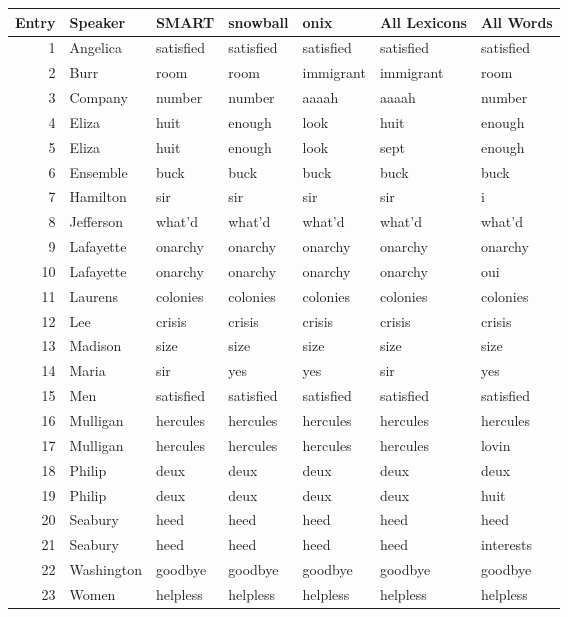 
\begin{tabular}{r|l|l|l|l|l|l}
\hline
\textbf{Entry} & \textbf{Speaker} & \textbf{SMART} & \textbf{snowball} & \textbf{onix} & \textbf{All Lexicons} & \textbf{All Words}\\
\hline
1 & Angelica & satisfied & satisfied & satisfied & satisfied & satisfied\\
\hline
2 & Burr & room & room & immigrant & immigrant & room\\
\hline
3 & Company & number & number & aaaah & aaaah & number\\
\hline
4 & Eliza & huit & enough & look & huit & enough\\
\hline
5 & Eliza & huit & enough & look & sept & enough\\
\hline
6 & Ensemble & buck & buck & buck & buck & buck\\
\hline
7 & Hamilton & sir & sir & sir & sir & i\\
\hline
8 & Jefferson & what'd & what'd & what'd & what'd & what'd\\
\hline
9 & Lafayette & onarchy & onarchy & onarchy & onarchy & onarchy\\
\hline
10 & Lafayette & onarchy & onarchy & onarchy & onarchy & oui\\
\hline
11 & Laurens & colonies & colonies & colonies & colonies & colonies\\
\hline
12 & Lee & crisis & crisis & crisis & crisis & crisis\\
\hline
13 & Madison & size & size & size & size & size\\
\hline
14 & Maria & sir & yes & yes & sir & yes\\
\hline
15 & Men & satisfied & satisfied & satisfied & satisfied & satisfied\\
\hline
16 & Mulligan & hercules & hercules & hercules & hercules & hercules\\
\hline
17 & Mulligan & hercules & hercules & hercules & hercules & lovin\\
\hline
18 & Philip & deux & deux & deux & deux & deux\\
\hline
19 & Philip & deux & deux & deux & deux & huit\\
\hline
20 & Seabury & heed & heed & heed & heed & heed\\
\hline
21 & Seabury & heed & heed & heed & heed & interests\\
\hline
22 & Washington & goodbye & goodbye & goodbye & goodbye & goodbye\\
\hline
23 & Women & helpless & helpless & helpless & helpless & helpless\\
\hline
\end{tabular}
